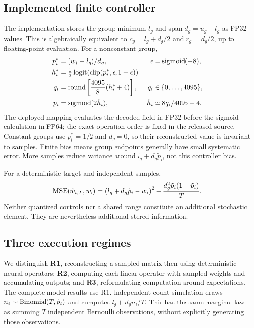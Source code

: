 \documentclass[11pt]{article}
\begin{document}
\subsection{Implemented finite controller}
The implementation stores the group minimum $l_g$ and span $d_g=u_g-l_g$ as FP32 values. This is algebraically equivalent to $c_g=l_g+d_g/2$ and $r_g=d_g/2$, up to floating-point evaluation. For a nonconstant group,
\begin{align}
 p_i^*&=(w_i-l_g)/d_g, & \epsilon&=\operatorname{sigmoid}(-8),\\
 h_i^*&=\tfrac12\operatorname{logit}(\operatorname{clip}(p_i^*,\epsilon,1-\epsilon)),\\
 q_i&=\operatorname{round}\left[\frac{4095}{8}(h_i^*+4)\right], &q_i&\in\{0,\ldots,4095\},\\
 \tilde p_i&=\operatorname{sigmoid}(2\hat h_i), &\hat h_i&\simeq 8q_i/4095-4.
 \label{eq:controller}
\end{align}
The deployed mapping evaluates the decoded field in FP32 before the sigmoid calculation in FP64; the exact operation order is fixed in the released source. Constant groups use $p_i^*=1/2$ and $d_g=0$, so their reconstructed value is invariant to samples. Finite bias means group endpoints generally have small systematic error. More samples reduce variance around $l_g+d_g\tilde p_i$, not this controller bias.

For a deterministic target and independent samples,
\begin{equation}
 \operatorname{MSE}(\hat w_{i,T},w_i)=\left(l_g+d_g\tilde p_i-w_i\right)^2+
 \frac{d_g^2\tilde p_i(1-\tilde p_i)}{T}.
 \label{eq:biasvariance}
\end{equation}
Neither quantized controls nor a shared range constitute an additional stochastic element. They are nevertheless additional stored information.

\subsection{Three execution regimes}
We distinguish \textbf{R1}, reconstructing a sampled matrix then using deterministic neural operators; \textbf{R2}, computing each linear operator with sampled weights and accumulating outputs; and \textbf{R3}, reformulating computation around expectations. The complete model results use R1. Independent count simulation draws $n_i\sim\operatorname{Binomial}(T,\tilde p_i)$ and computes $l_g+d_gn_i/T$. This has the same marginal law as summing $T$ independent Bernoulli observations, without explicitly generating those observations.
\end{document}
